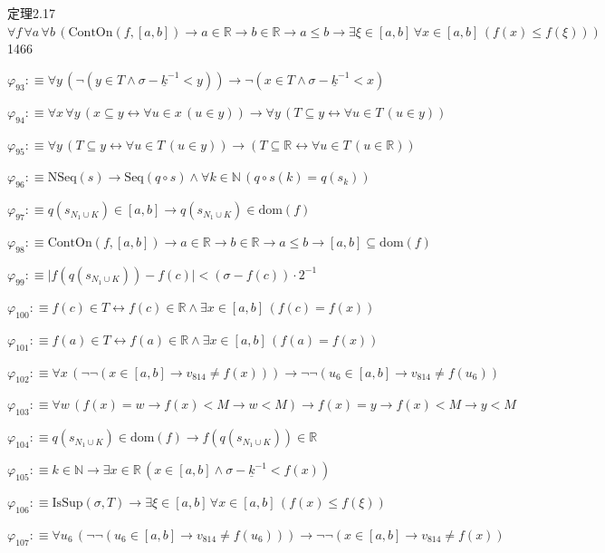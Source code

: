 \begin{fullproof}{定理2.17}{$\forall f\,\forall a\,\forall b\,(\mathrm{ContOn}(f,[a,b]) \to a \in \mathbb{R} \to b \in \mathbb{R} \to a \leq b \to \exists \xi \in [a,b]\,\forall x \in [a,b]\,(f(x) \leq f(\xi)))$}{1466}
\begin{abbrevlist}
\item $\varphi_{93} :\equiv \forall y\,(\neg (y \in T \land \sigma - \underline{k}^{-1} < y)) \to \neg (x \in T \land \sigma - \underline{k}^{-1} < x)$
\item $\varphi_{94} :\equiv \forall x\,\forall y\,(x \subseteq y \leftrightarrow \forall u \in x\,(u \in y)) \to \forall y\,(T \subseteq y \leftrightarrow \forall u \in T\,(u \in y))$
\item $\varphi_{95} :\equiv \forall y\,(T \subseteq y \leftrightarrow \forall u \in T\,(u \in y)) \to (T \subseteq \mathbb{R} \leftrightarrow \forall u \in T\,(u \in \mathbb{R}))$
\item $\varphi_{96} :\equiv \mathrm{NSeq}(s) \to \mathrm{Seq}(q \circ s) \land \forall k \in \mathbb{N}\,(q \circ s(k) = q(s_{k}))$
\item $\varphi_{97} :\equiv q(s_{N_{1} \cup K}) \in [a,b] \to q(s_{N_{1} \cup K}) \in \mathrm{dom}(f)$
\item $\varphi_{98} :\equiv \mathrm{ContOn}(f,[a,b]) \to a \in \mathbb{R} \to b \in \mathbb{R} \to a \leq b \to [a,b] \subseteq \mathrm{dom}(f)$
\item $\varphi_{99} :\equiv \lvert f(q(s_{N_{1} \cup K})) - f(c) \rvert < (\sigma - f(c)) \cdot 2^{-1}$
\item $\varphi_{100} :\equiv f(c) \in T \leftrightarrow f(c) \in \mathbb{R} \land \exists x \in [a,b]\,(f(c) = f(x))$
\item $\varphi_{101} :\equiv f(a) \in T \leftrightarrow f(a) \in \mathbb{R} \land \exists x \in [a,b]\,(f(a) = f(x))$
\item $\varphi_{102} :\equiv \forall x\,(\neg \neg (x \in [a,b] \to v_{814} \neq f(x))) \to \neg \neg (u_{6} \in [a,b] \to v_{814} \neq f(u_{6}))$
\item $\varphi_{103} :\equiv \forall w\,(f(x) = w \to f(x) < M \to w < M) \to f(x) = y \to f(x) < M \to y < M$
\item $\varphi_{104} :\equiv q(s_{N_{1} \cup K}) \in \mathrm{dom}(f) \to f(q(s_{N_{1} \cup K})) \in \mathbb{R}$
\item $\varphi_{105} :\equiv k \in \mathbb{N} \to \exists x \in \mathbb{R}\,(x \in [a,b] \land \sigma - \underline{k}^{-1} < f(x))$
\item $\varphi_{106} :\equiv \mathrm{IsSup}(\sigma,T) \to \exists \xi \in [a,b]\,\forall x \in [a,b]\,(f(x) \leq f(\xi))$
\item $\varphi_{107} :\equiv \forall u_{6}\,(\neg \neg (u_{6} \in [a,b] \to v_{814} \neq f(u_{6}))) \to \neg \neg (x \in [a,b] \to v_{814} \neq f(x))$

\end{abbrevlist}
\end{fullproof}
